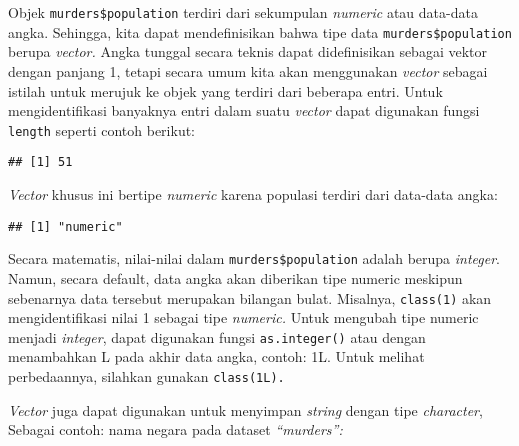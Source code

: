 \documentclass[
]{article}
\newenvironment{Shaded}{\begin{snugshade}}{\end{snugshade}}
\newcommand{\FunctionTok}[1]{\textcolor[rgb]{0.00,0.00,0.00}{#1}}
\newcommand{\NormalTok}[1]{#1}
\newcommand{\SpecialCharTok}[1]{\textcolor[rgb]{0.00,0.00,0.00}{#1}}
\begin{document}
Objek \texttt{murders\$population} terdiri dari sekumpulan
\emph{numeric} atau data-data angka. Sehingga, kita dapat mendefinisikan
bahwa tipe data \texttt{murders\$population} berupa \emph{vector.} Angka
tunggal secara teknis dapat didefinisikan sebagai vektor dengan panjang
1, tetapi secara umum kita akan menggunakan \emph{vector} sebagai
istilah untuk merujuk ke objek yang terdiri dari beberapa entri. Untuk
mengidentifikasi banyaknya entri dalam suatu \emph{vector} dapat
digunakan fungsi \texttt{length} seperti contoh berikut:

\begin{Shaded}
\end{Shaded}

\begin{verbatim}
## [1] 51
\end{verbatim}

\emph{Vector} khusus ini bertipe \emph{numeric} karena populasi terdiri
dari data-data angka:

\begin{Shaded}
\end{Shaded}

\begin{verbatim}
## [1] "numeric"
\end{verbatim}

Secara matematis, nilai-nilai dalam \texttt{murders\$population} adalah
berupa \emph{integer}. Namun, secara default, data angka akan diberikan
tipe numeric meskipun sebenarnya data tersebut merupakan bilangan bulat.
Misalnya, \texttt{class(1)} akan mengidentifikasi nilai 1 sebagai tipe
\emph{numeric.} Untuk mengubah tipe numeric menjadi \emph{integer},
dapat digunakan fungsi \texttt{as.integer()} atau dengan menambahkan L
pada akhir data angka, contoh: 1L. Untuk melihat perbedaannya, silahkan
gunakan \texttt{class(1L).}

\emph{Vector} juga dapat digunakan untuk menyimpan \emph{string} dengan
tipe \emph{character}, Sebagai contoh: nama negara pada dataset
\emph{``murders'':}

\begin{Shaded}
\end{Shaded}
\end{document}
